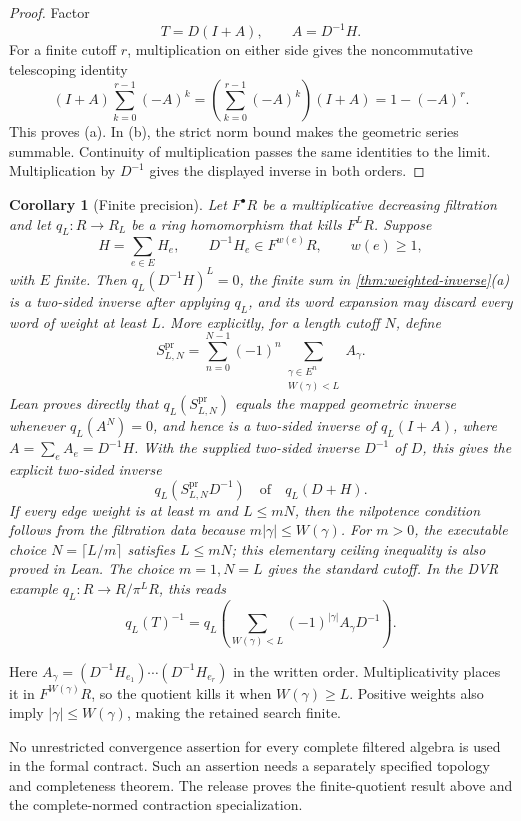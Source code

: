 \documentclass[11pt]{article}
\newtheorem{corollary}[theorem]{Corollary}
\theoremstyle{definition}
\theoremstyle{remark}
\begin{document}
\begin{proof}
Factor
\[
T=D(I+A),
\qquad A=D^{-1}H.
\]
For a finite cutoff $r$, multiplication on either side gives the
noncommutative telescoping identity
\[
(I+A)\sum_{k=0}^{r-1}(-A)^k
=
\left(\sum_{k=0}^{r-1}(-A)^k\right)(I+A)
=1-(-A)^r.
\]
This proves (a). In (b), the strict norm bound makes the geometric series
summable. Continuity of multiplication passes the same identities to the
limit. Multiplication by $D^{-1}$ gives the displayed inverse in both orders.
\end{proof}

\begin{corollary}[Finite precision]\label{cor:finite-precision}
Let $F^\bullet R$ be a multiplicative decreasing filtration and let
$q_L:R\to R_L$ be a ring homomorphism that kills $F^L R$. Suppose
\[
H=\sum_{e\in E}H_e,
\qquad D^{-1}H_e\in F^{w(e)}R,
\qquad w(e)\ge1,
\]
with $E$ finite. Then $q_L(D^{-1}H)^L=0$, the finite sum in
\cref{thm:weighted-inverse}(a) is a two-sided inverse after applying $q_L$,
and its word expansion may discard every word of weight at least $L$.
More explicitly, for a length cutoff $N$, define
\[
S^{\mathrm{pr}}_{L,N}
=
\sum_{n=0}^{N-1}(-1)^n
\sum_{\substack{\gamma\in E^n\\W(\gamma)<L}}A_\gamma.
\]
Lean proves directly that $q_L(S^{\mathrm{pr}}_{L,N})$ equals the mapped
geometric inverse whenever $q_L(A^N)=0$, and hence is a two-sided inverse of
$q_L(I+A)$, where $A=\sum_eA_e=D^{-1}H$. With the supplied two-sided
inverse $D^{-1}$ of $D$, this gives the explicit two-sided inverse
\[
\boxed{q_L\!\left(S^{\mathrm{pr}}_{L,N}D^{-1}\right)}
\quad\text{of}\quad q_L(D+H).
\]
If every edge weight is at least $m$ and $L\le mN$, then the nilpotence
condition follows from the filtration data because
$m|\gamma|\le W(\gamma)$. For $m>0$, the executable choice
$N=\lceil L/m\rceil$ satisfies $L\le mN$; this elementary ceiling inequality
is also proved in Lean. The choice $m=1,N=L$ gives the standard cutoff.
In the DVR example $q_L:R\to R/\pi^L R$, this reads
\[
q_L(T)^{-1}
=
q_L\!\left(\sum_{W(\gamma)<L}
(-1)^{|\gamma|}A_\gamma D^{-1}\right).
\]
\end{corollary}

Here $A_\gamma=(D^{-1}H_{e_1})\cdots(D^{-1}H_{e_r})$ in the written
order. Multiplicativity places it in $F^{W(\gamma)}R$, so the quotient kills
it when $W(\gamma)\ge L$. Positive weights also imply
$|\gamma|\le W(\gamma)$, making the retained search finite.

No unrestricted convergence assertion for every complete filtered algebra is
used in the formal contract. Such an assertion needs a separately specified
topology and completeness theorem. The release proves the finite-quotient
result above and the complete-normed contraction specialization.
\end{document}
